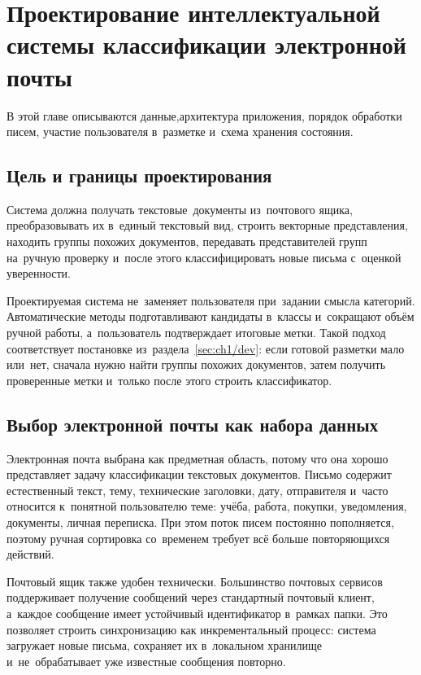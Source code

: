 \chapter{Проектирование интеллектуальной системы классификации электронной почты}\label{ch:ch2}

В этой главе описываются данные,архитектура приложения,
порядок обработки писем, участие пользователя в~разметке
и~схема хранения состояния.

\section{Цель и границы проектирования}\label{sec:ch2/goal}

Система должна получать текстовые~документы из~почтового ящика,
преобразовывать их в~единый текстовый вид, строить векторные
представления, находить группы похожих документов, передавать
представителей групп на~ручную проверку и~после этого классифицировать новые
письма с~оценкой уверенности.

Проектируемая система не~заменяет пользователя при~задании смысла категорий.
Автоматические методы подготавливают кандидаты в~классы и~сокращают объём
ручной работы, а~пользователь подтверждает итоговые метки. Такой подход
соответствует постановке из~раздела~\ref{sec:ch1/dev}: если готовой разметки
мало или~нет, сначала нужно найти группы похожих документов, затем получить
проверенные метки и~только после этого строить классификатор.

\section{Выбор электронной почты как набора данных}\label{sec:ch2/dataset}

Электронная почта выбрана как предметная область, потому что она хорошо
представляет задачу классификации текстовых документов. Письмо содержит
естественный текст, тему, технические заголовки, дату, отправителя и~часто
относится к~понятной пользователю теме: учёба, работа, покупки, уведомления,
документы, личная переписка. При этом поток писем постоянно пополняется, поэтому
ручная сортировка со~временем требует всё больше повторяющихся действий.

Почтовый ящик также удобен технически. Большинство почтовых сервисов
поддерживает получение сообщений через стандартный почтовый клиент, а~каждое
сообщение имеет устойчивый идентификатор в~рамках папки. Это позволяет строить
синхронизацию как инкрементальный процесс: система загружает новые письма,
сохраняет их в~локальном хранилище и~не~обрабатывает уже известные сообщения
повторно.

